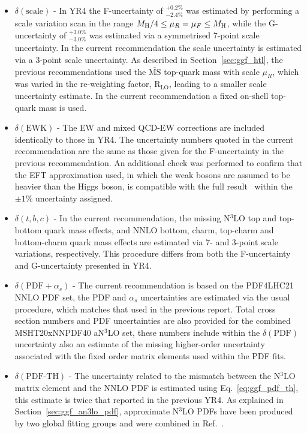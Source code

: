 \begin{itemize}
\item $\delta(\text{scale})$ - In YR4 the F-uncertainty of $^{+0.2\%}_{-2.4\%}$ was estimated by performing a scale variation scan in the range $M_\mathrm{H}/4 \le \mu_R = \mu_F \le M_\mathrm{H}$, while the G-uncertainty of $^{+3.0\%}_{-3.0\%}$ was estimated via a symmetrised 7-point scale uncertainty. 
In the current recommendation the scale uncertainty is estimated via a 3-point scale uncertainty.
As described in Section~\ref{sec:ggf_htl}, the previous recommendations used the $\overline{\mathrm{MS}}$ top-quark mass with scale $\mu_R$, which was varied in the re-weighting factor, $\text{R}_\text{LO}$, leading to a smaller scale uncertainty estimate.
In the current recommendation a fixed on-shell top-quark mass is used.
\item $\delta(\text{EWK})$ - The EW and mixed QCD-EW corrections are included identically to those in YR4.
The uncertainty numbers quoted in the current recommendation are the same as those given for the F-uncertainty in the previous recommendation.
An additional check was performed to confirm that the EFT approximation used, in which the weak bosons are assumed to be heavier than the Higgs boson, is compatible with the full result~\cite{Becchetti:2020wof} within the $\pm 1\%$ uncertainty assigned.
\item $\delta(t,b,c)$ - In the current recommendation, the missing N$^3$LO top and top-bottom quark mass effects, and NNLO bottom, charm, top-charm and bottom-charm quark mass effects are estimated via 7- and 3-point scale variations, respectively.
This procedure differs from both the F-uncertainty and G-uncertainty presented in YR4.
\item $\delta(\text{PDF}+\alpha_s)$ - The current recommendation is based on the PDF4LHC21 NNLO PDF set, the PDF and $\alpha_s$ uncertainties are estimated via the usual procedure, which matches that used in the previous report.
Total cross section numbers and PDF uncertainties are also provided for the combined MSHT20xNNPDF40 aN$^3$LO set, these numbers include within the $\delta(\text{PDF})$ uncertainty also an estimate of the missing higher-order uncertainty associated with the fixed order matrix elements used within the PDF fits.
\item $\delta(\text{PDF-TH})$ - The uncertainty related to the mismatch between the N$^3$LO matrix element and the NNLO PDF is estimated using Eq.~\eqref{eq:ggf_pdf_th}, this estimate is twice that reported in the previous YR4.
As explained in Section~\ref{sec:ggf_an3lo_pdf}, approximate N$^3$LO PDFs have been produced by two global fitting groups and were combined in Ref.~\cite{Cridge:2024icl}.

\end{itemize}
